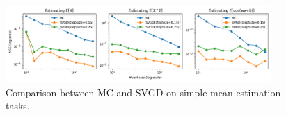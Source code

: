 \begin{figure}[!htbp]
    \centering
    \includegraphics[width=0.9\textwidth]{figs/toy-figure2-merged.png}
    \caption{Comparison between MC and SVGD on simple mean estimation tasks. }
    \label{fig:my_label}
\end{figure}
